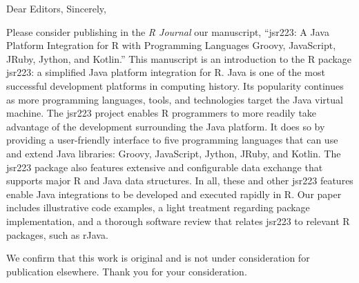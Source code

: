 \documentclass[12pt,signature,logo]{BYUstatletter}
\begin{document}
\begin{myletter}
{}
{}
{Dear Editors,}
{Sincerely,}

Please consider publishing in the \emph{R Journal} our manuscript, ``jsr223: A
Java Platform Integration for R with Programming Languages Groovy, JavaScript,
JRuby, Jython, and Kotlin.'' This manuscript is an introduction to the R
package jsr223: a simplified Java platform integration for R. Java is one of
the most successful development platforms in computing history. Its popularity
continues as more programming languages, tools, and technologies target the
Java virtual machine. The jsr223 project enables R programmers to more readily
take advantage of the development surrounding the Java platform. It does so by
providing a user-friendly interface to five programming languages that can use
and extend Java libraries: Groovy, JavaScript, Jython, JRuby, and Kotlin. The
jsr223 package also features extensive and configurable data exchange that
supports major R and Java data structures. In all, these and other jsr223
features enable Java integrations to be developed and executed rapidly in R.
Our paper includes illustrative code examples, a light treatment regarding
package implementation, and a thorough software review that relates jsr223 to
relevant R packages, such as rJava.

We confirm that this work is original and is not under consideration for
publication elsewhere.  Thank you for your consideration.

\end{myletter}
\end{document}
